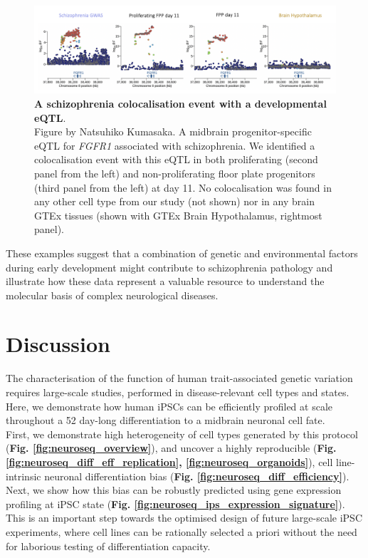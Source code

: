 \begin{figure}[h]
\centering
\includegraphics[width=15.5cm]{Chapter5/Fig/neuroseq_coloc_example2_FGFR1.png}
\caption[Second example of colocalisation]{\textbf{A schizophrenia colocalisation event with a developmental eQTL}.\\
Figure by Natsuhiko Kumasaka. A midbrain progenitor-specific eQTL for \textit{FGFR1} associated with schizophrenia. 
We identified a colocalisation event with this eQTL in both proliferating (second panel from the left) and non-proliferating floor plate progenitors (third panel from the left) at day 11. 
No colocalisation was found in any other cell type from our study (not shown) nor in any brain GTEx tissues (shown with GTEx Brain Hypothalamus, rightmost panel).}
\label{fig:neuroseq_coloc_example2}
\end{figure}

\newpage

These examples suggest that a combination of genetic and environmental factors during early development might contribute to schizophrenia pathology and illustrate how these data represent a valuable resource to understand the molecular basis of complex neurological diseases.

\section{Discussion}
\label{sec:neuroseq_discussion}

The characterisation of the function of human trait-associated genetic variation requires large-scale studies, performed in disease-relevant cell types and states. 
Here, we demonstrate how human iPSCs can be efficiently profiled at scale throughout a 52 day-long differentiation to a midbrain neuronal cell fate. \\

First, we demonstrate high heterogeneity of cell types generated by this protocol (\textbf{Fig. \ref{fig:neuroseq_overview}}), and uncover a highly reproducible (\textbf{Fig. \ref{fig:neuroseq_diff_eff_replication}, \ref{fig:neuroseq_organoids}}), cell line-intrinsic neuronal differentiation bias (\textbf{Fig. \ref{fig:neuroseq_diff_efficiency}}).
Next, we show how this bias can be robustly predicted using gene expression profiling at iPSC state (\textbf{Fig. \ref{fig:neuroseq_ips_expression_signature}}). 
This is an important step towards the optimised design of future large-scale iPSC experiments, where cell lines can be rationally selected a priori without the need for laborious testing of differentiation capacity. \\

